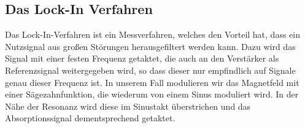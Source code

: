 \subsection{Das Lock-In Verfahren}

Das Lock-In-Verfahren ist ein Messverfahren, welches den Vorteil hat, dass ein Nutzsignal aus großen Störungen herausgefiltert werden kann. Dazu wird das Signal mit einer festen Frequenz getaktet, die auch an den Verstärker als Referenzsignal weitergegeben wird, so dass dieser nur empfindlich auf Signale genau dieser Frequenz ist.
In unserem Fall modulieren wir das Magnetfeld mit einer Sägezahnfunktion, die wiederum von einem Sinus moduliert wird. In der Nähe der Resonanz wird diese im Sinustakt überstrichen und das Absorptionssignal dementsprechend getaktet.
















